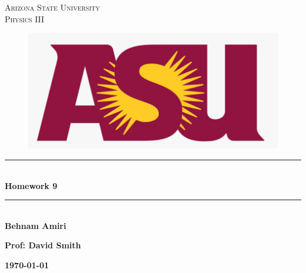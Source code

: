 \documentclass[fleqn]{article}
\begin{document}
  \begin{titlepage}

    \newcommand{\HRule}{\rule{\linewidth}{0.5mm}} %

    \center %
    

    \textsc{\LARGE Arizona State University}\\[1.5cm] %

    \textsc{\LARGE Physics III }\\[1.5cm] %


    \begin{figure}
      \includegraphics[width=\linewidth]{asu.png}
    \end{figure}


    \HRule \\[0.4cm]
    { \huge \bfseries Homework 9}\\[0.4cm] 
    \HRule \\[1.5cm]
    
    \textbf{Behnam Amiri}

    \bigbreak

    \textbf{Prof: David Smith}

    \bigbreak


    \textbf{{\large \today}\\[2cm]}

    \vfill %

  \end{titlepage}
\end{document}
